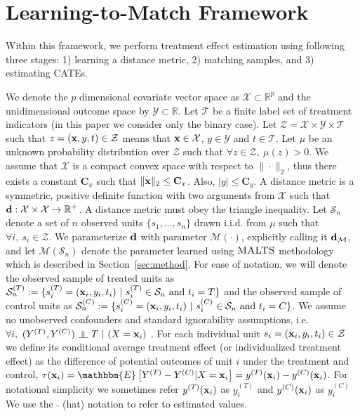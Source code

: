 \section{Learning-to-Match Framework}\label{sec:framework}
Within this framework, we perform treatment effect estimation using following three stages: 1) learning a distance metric, 2) matching samples, and 3) estimating CATEs. 

We denote the $p$ dimensional covariate vector space as $\mathcal{X}\subset \mathbb{R}^p$ and the unidimensional outcome space by $\mathcal{Y} \subset \mathbb{R}$. Let $\mathcal{T}$ be a finite label set of treatment indicators (in this paper we consider only the binary case). Let $\mathcal{Z}=\mathcal{X}\times\mathcal{Y}\times\mathcal{T}$ such that $z=(\mathbf{x},y,t)\in \mathcal{Z}$ means that $\mathbf{x}\in\mathcal{X}$, $y\in\mathcal{Y}$ and $t\in\mathcal{T}$. Let $\mu$ be an unknown probability distribution over $\mathcal{Z}$ such that $\forall z \in \mathcal{Z}, ~ \mu(z)>0$. We assume that $\mathcal{X}$ is a compact convex space with respect to $\|\cdot\|_2$, thus there exists a constant $\mathbf{C}_x$ such that $\|\mathbf{x}\|_2\leq\mathbf{C}_x$. Also, $|y|\leq\mathbf{C}_y$. A distance metric is a symmetric, positive definite function with two arguments from $\mathcal{X}$ such that $\mathbf{d}: \mathcal{X}\times\mathcal{X} \to \mathbb{R}^+$. A distance metric must obey the triangle inequality. Let $\mathcal{S}_n$ denote a set of $n$ observed units $\{s_1,...,s_n\}$ drawn i.i.d. from $\mu$ such that $\forall i, ~s_i \in \mathcal{Z}$. We parameterize $\mathbf{d}$ with parameter $\mathcal{M}(\cdot)$, explicitly calling it $\mathbf{d}_\mathcal{M}$, and let $\mathcal{M}(\mathcal{S}_n)$ denote the parameter learned using $\textsc{MALTS}$ methodology which is described in Section~\ref{sec:method}. 
For ease of notation, we will denote the observed sample of treated units as $\mathcal{S}^{(T)}_n := \{s^{(T)}_i = (\mathbf{x}_i,y_i,t_i)~|~ s^{(T)}_i \in \mathcal{S}_n \text{ and } t_i = T \}$ and the observed sample of control units as $\mathcal{S}^{(C)}_n := \{s^{(C)}_i = (\mathbf{x}_i,y_i,t_i)~|~ s^{(C)}_i \in \mathcal{S}_n \text{ and } t_i = C \}$.
We assume no unobserved confounders and standard ignorability assumptions, i.e.  $\forall i,~ (Y^{(T)},Y^{(C)})~ \indep ~T ~|~ (X=\x_i)$ \citep{Rubin2005}. For each individual unit $s_i = (\mathbf{x}_i,y_i,t_i) \in \mathcal{Z}$ we define its conditional average treatment effect (or individualized treatment effect) as the difference of potential outcomes of unit $i$ under the treatment and control, $\tau(\x_i) = \mathbbm{E}\left[Y^{(T)} - Y^{(C)} | X=\x_i \right] = y^{(T)}(\x_i) -y^{(C)}(\x_i)$. For notational simplicity we sometimes refer $y^{(T)}(\mathbf{x}_i)$ as $y^{(T)}_i$ and $y^{(C)}(\mathbf{x}_i)$ as $y^{(C)}_i$ We use the $\;\widehat{}$ (hat) notation to refer to estimated values. 


